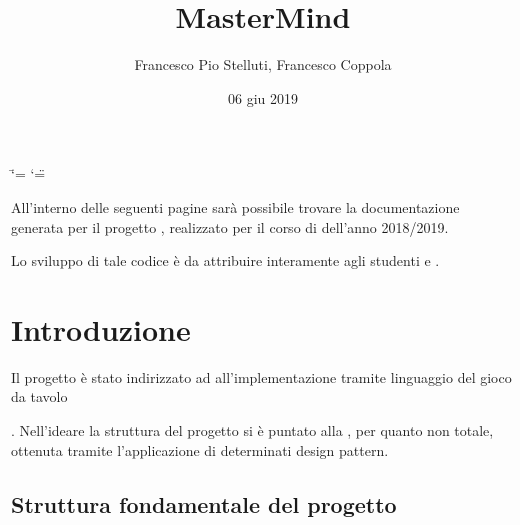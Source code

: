\documentclass[letterpaper,10pt,italian]{sphinxmanual}
\title{MasterMind}
\date{06 giu 2019}
\author{Francesco Pio Stelluti, Francesco Coppola}
\begin{document}
\ifdefined\shorthandoff
  \ifnum\catcode`\=\string=\active\shorthandoff{=}\fi
  \ifnum\catcode`\"=\active{}\fi
\fi

\pagestyle{empty}
\sphinxmaketitle
\pagestyle{plain}
\sphinxtableofcontents
\pagestyle{normal}
\label{\detokenize{index::doc}}

\begin{quote}

\begin{quote}

\begin{footnote}[1]\sphinxAtStartFootnote
{}
%
\end{footnote}
\end{quote}
\end{quote}

All’interno delle seguenti pagine sarà possibile trovare la documentazione
generata per il progetto , realizzato per il corso di 
dell’anno 2018/2019.

Lo sviluppo di tale codice è da attribuire interamente agli studenti  e .


\chapter{Introduzione}
\label{\detokenize{introduzione:introduzione}}\label{\detokenize{introduzione::doc}}
Il progetto è stato indirizzato ad all’implementazione tramite linguaggio 
del gioco da tavolo  %
\begin{footnote}[1]\sphinxAtStartFootnote
{}
%
\end{footnote}. Nell’ideare la struttura del progetto si è puntato
alla , per quanto non totale, ottenuta tramite l’applicazione
di determinati design pattern.


\section{Struttura fondamentale del progetto}
\label{\detokenize{introduzione:struttura-fondamentale-del-progetto}}
\noindent{}
\end{document}
